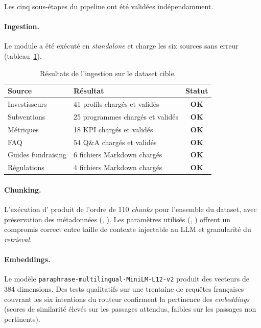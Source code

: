 Les cinq sous-étapes du pipeline ont été validées indépendamment.

\paragraph{Ingestion.} Le module  a été exécuté en \textit{standalone} et charge les six sources sans erreur (tableau~\ref{tab:ingestion}).

\begin{table}[H]
\centering
\caption{Résultats de l'ingestion sur le dataset cible.}
\label{tab:ingestion}
\begin{tabularx}{\textwidth}{@{}l X c@{}}
\toprule
\textbf{Source} & \textbf{Résultat} & \textbf{Statut} \\
\midrule
Investisseurs        & 41 profils chargés et validés & \textbf{OK} \\
Subventions          & 25 programmes chargés et validés & \textbf{OK} \\
Métriques            & 18 \ac{KPI} chargés et validés & \textbf{OK} \\
\ac{FAQ}             & 54 Q\&A chargés et validés & \textbf{OK} \\
Guides fundraising   & 6 fichiers Markdown chargés & \textbf{OK} \\
Régulations          & 4 fichiers Markdown chargés & \textbf{OK} \\
\bottomrule
\end{tabularx}
\end{table}

\paragraph{Chunking.} L'exécution d' produit de l'ordre de 110 \textit{chunks} pour l'ensemble du dataset, avec préservation des métadonnées (, ). Les paramètres utilisés (, ) offrent un compromis correct entre taille de contexte injectable au \ac{LLM} et granularité du \textit{retrieval}.

\paragraph{Embeddings.} Le modèle \texttt{paraphrase-multilingual-MiniLM-L12-v2} produit des vecteurs de 384 dimensions. Des tests qualitatifs sur une trentaine de requêtes françaises couvrant les six intentions du routeur confirment la pertinence des \textit{embeddings} (scores de similarité élevés sur les passages attendus, faibles sur les passages non pertinents).

